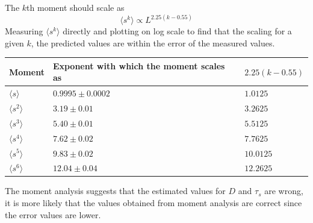 \documentclass[twoside]{article}
\begin{document}
The $k$th moment should scale as 
\[
\langle s^k \rangle \propto L^{2.25(k-0.55)}
\]
Measuring $\langle s^k \rangle$ directly and plotting on log scale to find that the scaling for a given $k$, the predicted values are within the error of the measured values.
\begin{center}
    \begin{tabular}{|l|l|l|}
    \hline
    Moment & Exponent with which the moment scales as & $2.25(k-0.55)$ \\ \hline
    $\langle s \rangle$ & $0.9995 \pm 0.0002$ & $1.0125$\\ \hline
    $\langle s^2 \rangle$ & $3.19 \pm 0.01$ & $3.2625$\\ \hline
    $\langle s^3 \rangle$ &  $5.40 \pm 0.01$ & $5.5125$\\ \hline
    $\langle s^4 \rangle$ &  $7.62 \pm 0.02$ & $7.7625$\\ \hline
    $\langle s^5 \rangle$ &  $9.83 \pm 0.02$ & $10.0125$\\ \hline
    $\langle s^6 \rangle$ &  $12.04 \pm 0.04$ & $12.2625$\\ \hline
    \end{tabular}
\end{center}
The moment analysis suggests that the estimated values for $D$ and $\tau_s$ are wrong, it is more likely that the values obtained from moment analysis are correct since the error values are lower.
\end{document}
